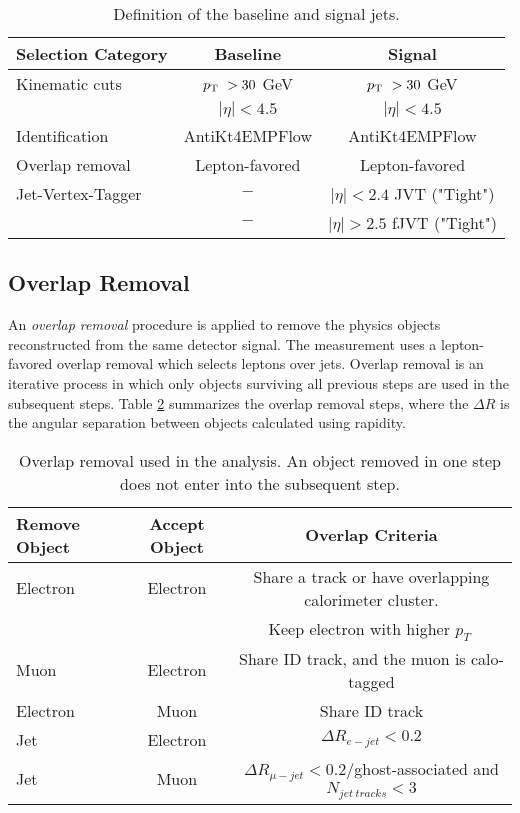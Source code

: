 \begin{table}[ht]
	\centering
	\caption{Definition of the baseline and signal jets.\label{tab:jets}}
		\begin{tabular}{|| l || c | c ||}
		\hline
		Selection Category & \textbf{Baseline} & \textbf{Signal} \\
		\hline\hline
		Kinematic cuts & $p_{\textrm{T} ~} > 30$ GeV & $p_{\textrm{T} ~} > 30$ GeV \\
			 & $|\eta| < 4.5$ & $|\eta| < 4.5$\\
		\hline 
		Identification & AntiKt4EMPFlow & AntiKt4EMPFlow\\
		\hline
		Overlap removal & Lepton-favored & Lepton-favored\\
		\hline
		Jet-Vertex-Tagger & $-$ & $ |\eta| < 2.4 $ JVT ("Tight")\\
				& $-$ & $|\eta| > 2.5 $ fJVT ("Tight")\\
		\hline
	\end{tabular}
\end{table}

\subsection{Overlap Removal}
\label{subsec:OR}

An \textit{overlap removal} procedure is applied to remove the physics objects reconstructed from the same detector signal. The measurement uses a lepton-favored overlap removal which selects leptons over jets. Overlap removal is an iterative process in which only objects surviving all previous steps are used in the subsequent steps. Table \ref{tab:overlap_removal} summarizes the overlap removal steps, where the $\Delta R$ is the angular separation between objects calculated using rapidity.

\begin{table}[ht]
	\centering
		\caption{Overlap removal used in the analysis. An object removed in one step does not enter into the subsequent step. \label{tab:overlap_removal}}
		\begin{tabular}{|| l || c | c ||}
		\hline
		Remove Object & Accept Object & Overlap Criteria \\
		\hline\hline
		Electron & Electron & Share a track or have overlapping calorimeter cluster.\\
				&		& Keep electron with higher $p_{T}~$\\
		\hline
		Muon & Electron & Share ID track, and the muon is calo-tagged\\
		\hline
		Electron & Muon & Share ID track\\
		\hline
		Jet & Electron & $\Delta R_{e-jet} < 0.2$ \\
		\hline 
		Jet & Muon & $\Delta R_{\mu-jet} < 0.2/$ghost-associated and $N_{jet~tracks} < 3$\\
		\hline
	\end{tabular}
\end{table}